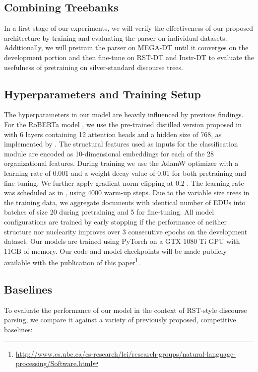 \documentclass[11pt]{article}
\begin{document}
\subsection{Combining Treebanks}
\label{comb_treebanks}
In a first stage of our experiments, we will verify the effectiveness of our proposed architecture by training and evaluating the parser on individual datasets. Additionally, we will pretrain the parser on MEGA-DT until it converges on the development portion and then fine-tune on RST-DT and Instr-DT to evaluate the usefulness of pretraining on silver-standard discourse trees.


\subsection{Hyperparameters and Training Setup} 
\label{hyper}
The hyperparameters in our model are heavily influenced by previous findings. For the RoBERTa model \cite{liu2019roberta}, we use the pre-trained distilled version proposed in  with 6 layers containing 12 attention heads and a hidden size of 768, as implemented by .
The structural features used as inputs for the classification module are encoded as 10-dimensional embeddings for each of the 28 organizational features. During training we use the AdamW optimizer \cite{loshchilov2018decoupled} with a learning rate of 0.001 and a weight decay value of 0.01 for both pretraining and fine-tuning. We further apply gradient norm clipping at 0.2 \cite{pascanu2013difficulty}. The learning rate was scheduled as in , using 4000 warm-up steps. Due to the variable size trees in the training data, we aggregate documents with identical number of EDUs into batches of size 20 during pretraining and 5 for fine-tuning. All model configurations are trained by early stopping if the performance of neither structure nor nuclearity improves  over 3 consecutive epochs on the development dataset. Our models are trained using PyTorch \cite{NIPS2019_pytorch} on a GTX 1080 Ti GPU with 11GB of memory. 
Our code and model-checkpoints will be made publicly available with the publication of this paper\footnote{\url{http://www.cs.ubc.ca/cs-research/lci/research-groups/natural-language-processing/Software.html}}.

\subsection{Baselines}
\label{baselines}
To evaluate the performance of our model in the context of RST-style discourse parsing, we compare it against a variety of previously proposed, competitive baselines:
\end{document}
